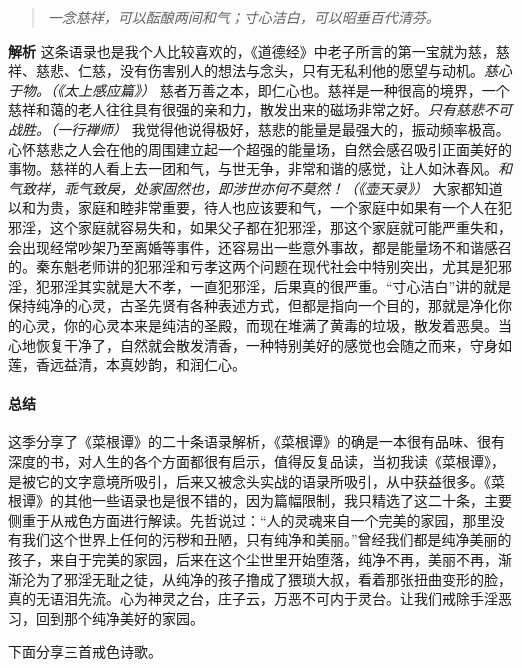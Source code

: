 \begin{quote}\it
    一念慈祥，可以酝酿两间和气；寸心洁白，可以昭垂百代清芬。
\end{quote}

\textbf{解析} 这条语录也是我个人比较喜欢的，《道德经》中老子所言的第一宝就为慈，慈祥、慈悲、仁慈，没有伤害别人的想法与念头，只有无私利他的愿望与动机。\textit{慈心于物。（《太上感应篇》）} 慈者万善之本，即仁心也。慈祥是一种很高的境界，一个慈祥和蔼的老人往往具有很强的亲和力，散发出来的磁场非常之好。\textit{只有慈悲不可战胜。（一行禅师）} 我觉得他说得极好，慈悲的能量是最强大的，振动频率极高。心怀慈悲之人会在他的周围建立起一个超强的能量场，自然会感召吸引正面美好的事物。慈祥的人看上去一团和气，与世无争，非常和谐的感觉，让人如沐春风。\textit{和气致祥，乖气致戾，处家固然也，即涉世亦何不莫然！（《壶天录》）} 大家都知道以和为贵，家庭和睦非常重要，待人也应该要和气，一个家庭中如果有一个人在犯邪淫，这个家庭就容易失和，如果父子都在犯邪淫，那这个家庭就可能严重失和，会出现经常吵架乃至离婚等事件，还容易出一些意外事故，都是能量场不和谐感召的。秦东魁老师讲的犯邪淫和亏孝这两个问题在现代社会中特别突出，尤其是犯邪淫，犯邪淫其实就是大不孝，一直犯邪淫，后果真的很严重。“寸心洁白”讲的就是保持纯净的心灵，古圣先贤有各种表述方式，但都是指向一个目的，那就是净化你的心灵，你的心灵本来是纯洁的圣殿，而现在堆满了黄毒的垃圾，散发着恶臭。当心地恢复干净了，自然就会散发清香，一种特别美好的感觉也会随之而来，守身如莲，香远益清，本真妙韵，和润仁心。

\paragraph*{总结}

这季分享了《菜根谭》的二十条语录解析，《菜根谭》的确是一本很有品味、很有深度的书，对人生的各个方面都很有启示，值得反复品读，当初我读《菜根谭》，是被它的文字意境所吸引，后来又被念头实战的语录所吸引，从中获益很多。《菜根谭》的其他一些语录也是很不错的，因为篇幅限制，我只精选了这二十条，主要侧重于从戒色方面进行解读。先哲说过：“人的灵魂来自一个完美的家园，那里没有我们这个世界上任何的污秽和丑陋，只有纯净和美丽。”曾经我们都是纯净美丽的孩子，来自于完美的家园，后来在这个尘世里开始堕落，纯净不再，美丽不再，渐渐沦为了邪淫无耻之徒，从纯净的孩子撸成了猥琐大叔，看着那张扭曲变形的脸，真的无语泪先流。心为神灵之台，庄子云，万恶不可内于灵台。让我们戒除手淫恶习，回到那个纯净美好的家园。

下面分享三首戒色诗歌。

